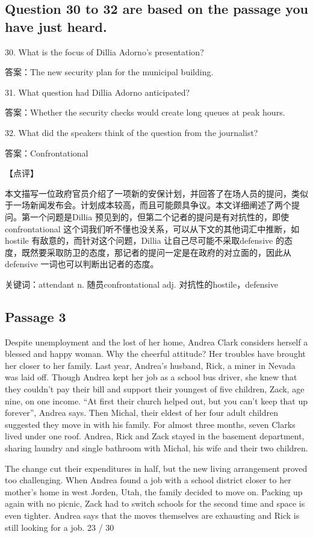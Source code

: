 \documentclass[UTF8,11pt]{ctexart}
\begin{document}
\subsection*{Question 30 to 32 are based on the passage you have just heard.}


30. What is the focus of Dillia Adorno’s presentation?


答案：The new security plan for the municipal building.


31. What question had Dillia Adorno anticipated?


答案：Whether the security checks would create long queues at peak hours.


32. What did the speakers think of the question from the journalist?


答案：Confrontational


【点评】


本文描写一位政府官员介绍了一项新的安保计划，并回答了在场人员的提问，类似于一场新闻发布会。计划成本较高，而且可能颇具争议。本文详细阐述了两个提问。第一个问题是Dillia 预见到的，但第二个记者的提问是有对抗性的，即使confrontational 这个词我们听不懂也没关系，可以从下文的其他词汇中推断，如hostile 有敌意的，而针对这个问题，Dillia 让自己尽可能不采取defensive 的态度，既然要采取防卫的态度，那记者的提问一定是在政府的对立面的，因此从defensive 一词也可以判断出记者的态度。


关键词：attendant n. 随员confrontational adj. 对抗性的hostile，defensive


\subsection*{Passage 3}


Despite unemployment and the lost of her home, Andrea Clark considers herself a blessed and happy woman. Why the cheerful attitude? Her troubles have brought her closer to her family. Last year, Andrea’s husband, Rick, a miner in Nevada was laid off. Though Andrea kept her job as a school bus driver, she knew that they couldn’t pay their bill and support their youngest of five children, Zack, age nine, on one income. “At first their church helped out, but you can’t keep that up forever”, Andrea says. Then Michal, their eldest of her four adult children suggested they move in with his family. For almost three months, seven Clarks lived under one roof. Andrea, Rick and Zack stayed in the basement department, sharing laundry and single bathroom with Michal, his wife and their two children.


The change cut their expenditures in half, but the new living arrangement proved too challenging. When Andrea found a job with a school district closer to her mother’s home in west Jorden, Utah, the family decided to move on. Packing up again with no picnic, Zack had to switch schools for the second time and space is even tighter. Andrea says that the moves themselves are exhausting and Rick is still looking for a job. 23 / 30
\end{document}
